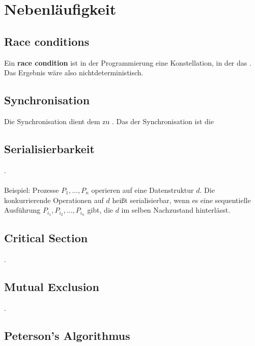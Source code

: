 \section{Nebenläufigkeit}

    
\subsection{Race conditions}
Ein \textbf{race condition} ist in der Programmierung eine Konstellation, in der das . Das Ergebnis wäre also nichtdeterministisch.

\subsection{Synchronisation}
Die Synchronisation dient dem   zu . Das  der Synchronisation ist die 

\subsection{Serialisierbarkeit}
.

\paragraph*{}
Beispiel: Prozesse $P_1, ..., P_n$ operieren auf eine Datenstruktur $d$. Die konkurrierende Operationen auf $d$ heißt serialisierbar, wenn es eine sequentielle Ausführung $P_{i_{1}}, P_{i_{2}}, ..., P_{i_{n}}$ gibt, die $d$ im selben Nachzustand hinterlässt.

\subsection{Critical Section}
.

\subsection{Mutual Exclusion}
.

\subsection{Peterson's Algorithmus}

